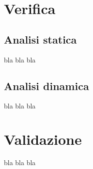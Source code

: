 \section{Verifica}
\subsection{Analisi statica}
bla bla bla
\subsection{Analisi dinamica}
bla bla bla

\section{Validazione}
bla bla bla
